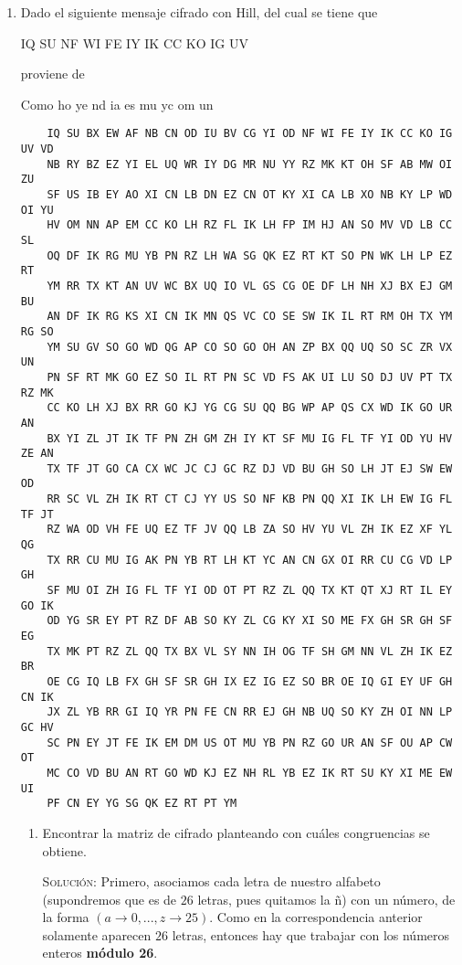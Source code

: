 \documentclass[letterpaper,11pt]{article}
\begin{document}
\begin{enumerate}
    \item Dado el siguiente mensaje cifrado con Hill, del cual se tiene que 
    \begin{center}
        IQ SU NF WI FE IY IK CC KO IG UV
    \end{center}
    
    proviene de 
    \begin{center}
        Como ho ye nd ia es mu yc om un
    \end{center}
    
    \begin{verbatim}
    IQ SU BX EW AF NB CN OD IU BV CG YI OD NF WI FE IY IK CC KO IG UV VD
    NB RY BZ EZ YI EL UQ WR IY DG MR NU YY RZ MK KT OH SF AB MW OI ZU
    SF US IB EY AO XI CN LB DN EZ CN OT KY XI CA LB XO NB KY LP WD OI YU
    HV OM NN AP EM CC KO LH RZ FL IK LH FP IM HJ AN SO MV VD LB CC SL
    OQ DF IK RG MU YB PN RZ LH WA SG QK EZ RT KT SO PN WK LH LP EZ RT
    YM RR TX KT AN UV WC BX UQ IO VL GS CG OE DF LH NH XJ BX EJ GM BU
    AN DF IK RG KS XI CN IK MN QS VC CO SE SW IK IL RT RM OH TX YM RG SO
    YM SU GV SO GO WD QG AP CO SO GO OH AN ZP BX QQ UQ SO SC ZR VX UN
    PN SF RT MK GO EZ SO IL RT PN SC VD FS AK UI LU SO DJ UV PT TX RZ MK
    CC KO LH XJ BX RR GO KJ YG CG SU QQ BG WP AP QS CX WD IK GO UR AN
    BX YI ZL JT IK TF PN ZH GM ZH IY KT SF MU IG FL TF YI OD YU HV ZE AN
    TX TF JT GO CA CX WC JC CJ GC RZ DJ VD BU GH SO LH JT EJ SW EW OD
    RR SC VL ZH IK RT CT CJ YY US SO NF KB PN QQ XI IK LH EW IG FL TF JT
    RZ WA OD VH FE UQ EZ TF JV QQ LB ZA SO HV YU VL ZH IK EZ XF YL QG
    TX RR CU MU IG AK PN YB RT LH KT YC AN CN GX OI RR CU CG VD LP GH
    SF MU OI ZH IG FL TF YI OD OT PT RZ ZL QQ TX KT QT XJ RT IL EY GO IK
    OD YG SR EY PT RZ DF AB SO KY ZL CG KY XI SO ME FX GH SR GH SF EG
    TX MK PT RZ ZL QQ TX BX VL SY NN IH OG TF SH GM NN VL ZH IK EZ BR
    OE CG IQ LB FX GH SF SR GH IX EZ IG EZ SO BR OE IQ GI EY UF GH CN IK
    JX ZL YB RR GI IQ YR PN FE CN RR EJ GH NB UQ SO KY ZH OI NN LP GC HV
    SC PN EY JT FE IK EM DM US OT MU YB PN RZ GO UR AN SF OU AP CW OT
    MC CO VD BU AN RT GO WD KJ EZ NH RL YB EZ IK RT SU KY XI ME EW UI
    PF CN EY YG SG QK EZ RT PT YM
    \end{verbatim}
    
    \begin{enumerate}
        \item Encontrar la matriz de cifrado planteando con cuáles congruencias
        se obtiene.
        
        \textsc{Solución:} Primero, asociamos cada letra de nuestro alfabeto
        (supondremos que es de $26$ letras, pues quitamos la ñ) con un número,
        de la forma $(a \rightarrow 0, ..., z \rightarrow 25)$. Como en la
        correspondencia anterior solamente aparecen $26$ letras, entonces hay 
        que trabajar con los números enteros \textbf{módulo 26}.
        

\end{enumerate}
\end{enumerate}
\end{document}

